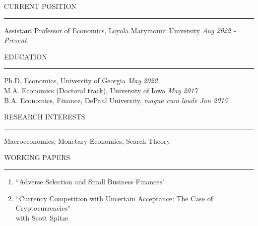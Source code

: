 \documentclass{resume} %
\renewenvironment{rSection}[1]{
\sectionskip
\textcolor{lmublue}{\MakeUppercase{#1}}
\sectionlineskip
\hrule
\begin{list}{}{
\setlength{\leftmargin}{1.5em}
}
\item[]
}{
\end{list}
}
\begin{document}
\begin{rSection}{CURRENT POSITION} 
Assistant Professor of Economics, Loyola Marymount University \hfill {\em Aug 2022 - Present}
\end{rSection}


\begin{rSection}{Education}





Ph.D. Economics, University of Georgia \hfill {\em May 2022} \\ 
M.A. Economics (Doctoral track), University of Iowa \hfill {\em May 2017} \\
B.A. Economics, Finance, DePaul University, {\em magna cum laude} \hfill {\em  Jun 2015}

\end{rSection}


\begin{rSection}{RESEARCH INTERESTS}
Macroeconomics, Monetary Economics, Search Theory 
\end{rSection}


\begin{rSection}{Working Papers}
\begin{enumerate} 
\item ``Adverse Selection and Small Business Finances" 
\item ``Currency Competition with Uncertain Acceptance: The Case of Cryptocurrencies" 
	\\ with Scott Spitze 
\end{enumerate} 	
\end{rSection}
\end{document}
